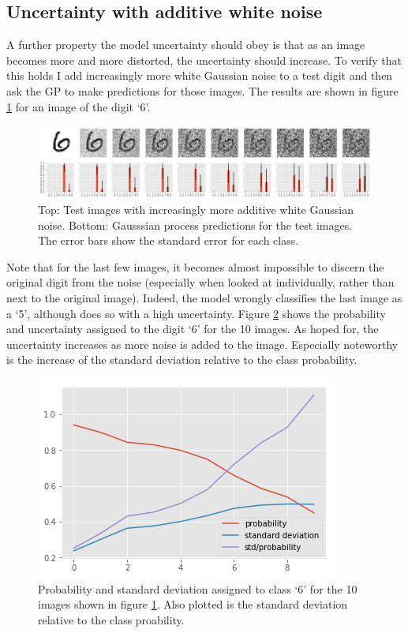 \documentclass{article}
\begin{document}
\subsection{Uncertainty with additive white noise}
A further property the model uncertainty should obey is that as an image becomes more and more distorted, the uncertainty should increase. To verify that this holds I add increasingly more white Gaussian noise to a test digit and then ask the GP to make predictions for those images. The results are shown in figure \ref{fig/awgn_predictions} for an image of the digit `6'.
\begin{figure}[h]
	\centering
	\includegraphics[width=1.0\textwidth]{awgn_predictions}
	\caption{Top: Test images with increasingly more additive white Gaussian noise. Bottom: Gausssian process predictions for the test images. The error bars show the standard error for each class.}
	\label{fig/awgn_predictions}
\end{figure}
Note that for the last few images, it becomes almost impossible to discern the original digit from the noise (especially when looked at individually, rather than next to the original image). Indeed, the model wrongly classifies the last image as a `5', although does so with a high uncertainty. Figure \ref{fig/awgn_predictions_stds} shows the probability and uncertainty assigned to the digit `6' for the 10 images. As hoped for, the uncertainty increases as more noise is added to the image. Especially noteworthy is the increase of the standard deviation relative to the class probability.
\begin{figure}[h]
	\centering
	\includegraphics[scale=0.4]{awgn_predictions_stds}
	\caption{Probability and standard deviation assigned to class `6' for the 10 images shown in figure \ref{fig/awgn_predictions}. Also plotted is the standard deviation relative to the class proability.}
	\label{fig/awgn_predictions_stds}
\end{figure}
\end{document}

